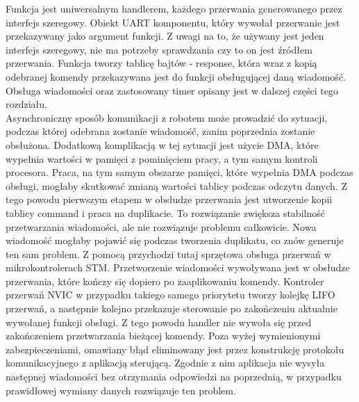 \documentclass[eng,printmode]{mgr}
\begin{document}
Funkcja jest uniwersalnym handlerem, każdego przerwania generowanego przez interfejs szeregowy. Obiekt UART komponentu, który wywołał przerwanie jest przekazywany jako argument funkcji. Z uwagi na to, że używany jest jeden interfejs szeregowy, nie ma potrzeby sprawdzania czy to on jest źródłem przerwania. Funkcja tworzy tablicę bajtów - response, która wraz z kopią odebranej komendy przekazywana jest do funkcji obsługującej daną wiadomość. Obsługa wiadomości oraz zastosowany timer opisany jest w dalszej części tego rozdziału.
\\Asynchroniczny sposób komunikacji z robotem może prowadzić do sytuacji, podczas której odebrana zostanie wiadomość, zanim poprzednia zostanie obsłużona. Dodatkową komplikacją w tej sytuacji jest użycie DMA, które wypełnia wartości w pamięci z pominięciem pracy, a tym samym kontroli procesora. Praca, na tym samym obszarze pamięci, które wypełnia DMA podczas obsługi, mogłaby skutkować zmianą wartości tablicy podczas odczytu danych. Z tego powodu pierwszym etapem w obsłudze przerwania jest utworzenie kopii tablicy command i praca na duplikacie. To rozwiązanie zwiększa stabilność przetwarzania wiadomości, ale nie rozwiązuje problemu całkowicie. Nowa wiadomość mogłaby pojawić się podczas tworzenia duplikatu, co znów generuje ten sam problem. Z pomocą przychodzi tutaj sprzętowa obsługa przerwań w mikrokontrolerach STM. Przetworzenie wiadomości wywoływana jest w obsłudze przerwania, które kończy się dopiero po zaaplikowaniu komendy. Kontroler przerwań NVIC w przypadku takiego samego priorytetu tworzy kolejkę LIFO przerwań, a następnie kolejno przekazuje sterowanie po zakończeniu aktualnie wywołanej funkcji obsługi. Z tego powodu handler nie wywoła się przed zakończeniem przetwarzania bieżącej komendy. Poza wyżej wymienionymi zabezpieczeniami, omawiany błąd eliminowany jest przez konstrukcję protokołu komunikacyjnego z aplikacją sterującą. Zgodnie z nim aplikacja nie wysyła następnej wiadomości bez otrzymania odpowiedzi na poprzednią, w przypadku prawidłowej wymiany danych rozwiązuje ten problem.
\end{document}
